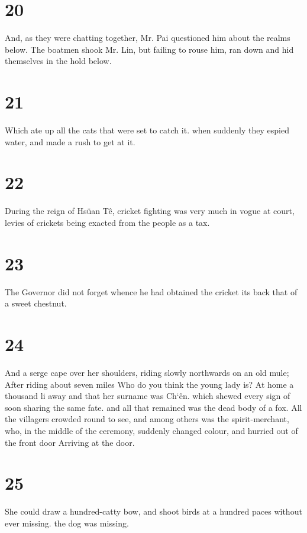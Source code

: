 \documentclass[11pt,a5paper]{book}
\begin{document}
\chapter*{\normalfont\Large 20}
And, as they were chatting together, Mr. Pai questioned him about the realms below. The boatmen shook Mr. Lin, but failing to rouse him, ran down and hid themselves in the hold below.
\clearpage

\chapter*{\normalfont\Large 21}
Which ate up all the cats that were set to catch it. when suddenly they espied water, and made a rush to get at it.
\clearpage

\chapter*{\normalfont\Large 22}
During the reign of Hsüan Tê, cricket fighting was very much in vogue at court, levies of crickets being exacted from the people as a tax.
\clearpage

\chapter*{\normalfont\Large 23}
The Governor did not forget whence he had obtained the cricket its back that of a sweet chestnut.
\clearpage

\chapter*{\normalfont\Large 24}
And a serge cape over her shoulders, riding slowly northwards on an old mule; After riding about seven miles Who do you think the young lady is? At home a thousand li away and that her surname was Ch‘ên. which shewed every sign of soon sharing the same fate. and all that remained was the dead body of a fox. All the villagers crowded round to see, and among others was the spirit-merchant, who, in the middle of the ceremony, suddenly changed colour, and hurried out of the front door Arriving at the door.
\clearpage

\chapter*{\normalfont\Large 25}
She could draw a hundred-catty bow, and shoot birds at a hundred paces without ever missing. the dog was missing.
\clearpage
\end{document}
